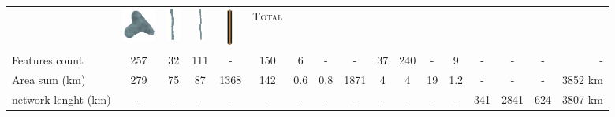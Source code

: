 \documentclass[portrait, A0]{sciposter}
\begin{document}
\begin{minipage}[b]{\textwidth}
\begin{multicols}{3}
\begin{tabular}{l|cccccccc|c|ccccc|c|r}
&\includegraphics[height=30pt]{gfx/lac_couleur.png}
&\includegraphics[height=30pt]{gfx/riviere_medium_couleur.png}
&\includegraphics[height=30pt]{gfx/riviere_small_couleur.png}
&\includegraphics[height=35pt]{gfx/routes_couleur.png}
&\textsc{Total}\\
Features count&257&32&111&-&150&6&-&-&37&240&-&9&-&-&-&-\\
Area sum (km\up{2})&\num{279}&\num{75}&\num{87}&\num{1368}&\num{142}&\num{0,6}&\num{0,8}&\num{1871}&\num{4}&\num{4}&\num{19}&\num{1,2}&-&-&-&\num{3852} km\up{2}\\
network lenght (km)&-&-&-&-&-&-&-&-&-&-&-&-&\num{341}&\num{2841}&\num{624}&\num{3807} km
\end{tabular}


\footnotesize


\end{multicols}
\end{minipage}
\end{document}
